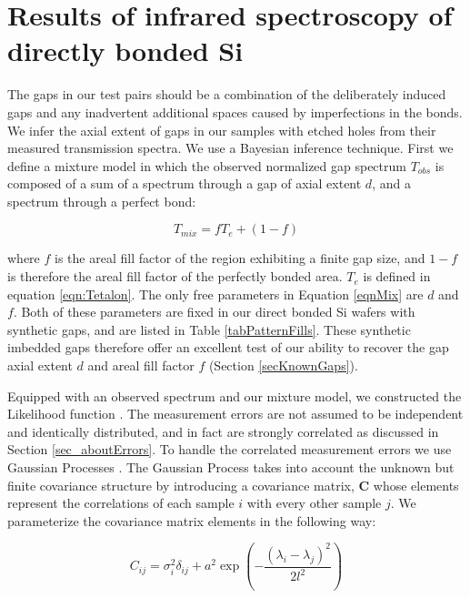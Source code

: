 \documentclass[osajnl,preprint,showpacs,superscriptaddress,12pt]{revtex4-1} %
\begin{document}
\section{Results of infrared spectroscopy of directly bonded Si}
\label{secResults}

The gaps in our test pairs should be a combination of the deliberately induced gaps and any inadvertent additional spaces caused by imperfections in the bonds.  We infer the axial extent of gaps in our samples with etched holes from their measured transmission spectra.  We use a Bayesian inference technique.  First we define a mixture model in which the observed normalized gap spectrum $T_{obs}$ is composed of a sum of a spectrum through a gap of axial extent $d$, and a spectrum through a perfect bond:

\begin{equation}
	T_{mix} = f T_{e} + (1-f) \label{eqnMix}
\end{equation}

where $f$ is the areal fill factor of the region exhibiting a finite gap size, and $1-f$ is therefore the areal fill factor of the perfectly bonded area.  $T_e$ is defined in equation \ref{eqn:Tetalon}.  The only free parameters in Equation \ref{eqnMix} are $d$ and $f$.  Both of these parameters are fixed in our direct bonded Si wafers with synthetic gaps, and are listed in Table \ref{tabPatternFills}.  These synthetic imbedded gaps therefore offer an excellent test of our ability to recover the gap axial extent $d$ and areal fill factor $f$ (Section \ref{secKnownGaps}).

Equipped with an observed spectrum and our mixture model, we constructed the Likelihood function \cite{2013sdmm.book.....I}.  The measurement errors are not assumed to be independent and identically distributed, and in fact are strongly correlated as discussed in Section \ref{sec_aboutErrors}.  To handle the correlated measurement errors we use Gaussian Processes \cite{rasmussen2006gaussian, DFMgp}.  The Gaussian Process takes into account the unknown but finite covariance structure by introducing a covariance matrix, $\boldsymbol{C}$ whose elements represent the correlations of each sample $i$ with every other sample $j$.  We parameterize the covariance matrix elements in the following way:

\begin{equation}
	C_{ij} = \sigma^2_{i}\delta_{ij}+a^2\exp{(-\frac{(\lambda_i-\lambda_j)^2}{2l^2})} \label{eqnGPkernel}
\end{equation}
\end{document}
